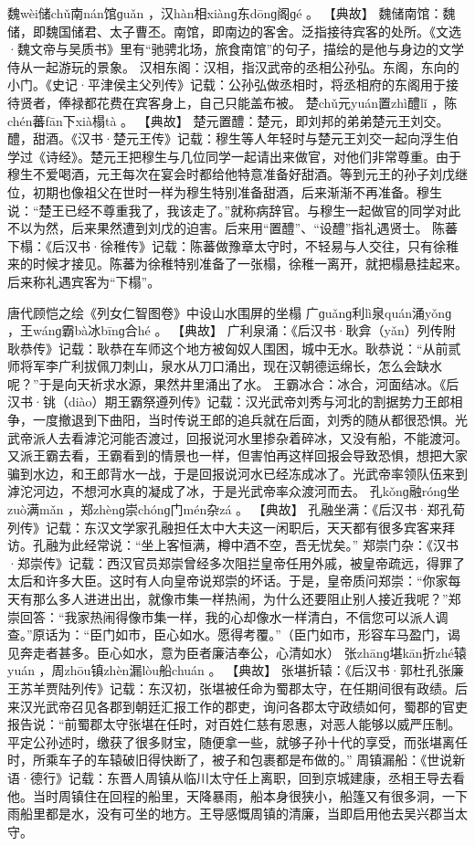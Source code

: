 \documentclass[12pt,UTF8]{ctexbook}
\begin{document}
魏wèi储chǔ南nán馆ɡuǎn
，汉hàn相xiànɡ东dōnɡ阁ɡé
。
【典故】
魏储南馆：魏储，即魏国储君、太子曹丕。南馆，即南边的客舍。泛指接待宾客的处所。《文选·魏文帝与吴质书》里有“驰骋北场，旅食南馆”的句子，描绘的是他与身边的文学侍从一起游玩的景象。
汉相东阁：汉相，指汉武帝的丞相公孙弘。东阁，东向的小门。《史记·平津侯主父列传》记载：公孙弘做丞相时，将丞相府的东阁用于接待贤者，俸禄都花费在宾客身上，自己只能盖布被。
楚chǔ元yuán置zhì醴lǐ
，陈chén蕃fān下xià榻tà
。
【典故】
楚元置醴：楚元，即刘邦的弟弟楚元王刘交。醴，甜酒。《汉书·楚元王传》记载：穆生等人年轻时与楚元王刘交一起向浮生伯学过《诗经》。楚元王把穆生与几位同学一起请出来做官，对他们非常尊重。由于穆生不爱喝酒，元王每次在宴会时都给他特意准备好甜酒。等到元王的孙子刘戊继位，初期也像祖父在世时一样为穆生特别准备甜酒，后来渐渐不再准备。穆生说：“楚王已经不尊重我了，我该走了。”就称病辞官。与穆生一起做官的同学对此不以为然，后来果然遭到刘戊的迫害。后来用“置醴”、“设醴”指礼遇贤士。
陈蕃下榻：《后汉书·徐稚传》记载：陈蕃做豫章太守时，不轻易与人交往，只有徐稚来的时候才接见。陈蕃为徐稚特别准备了一张榻，徐稚一离开，就把榻悬挂起来。后来称礼遇宾客为“下榻”。

唐代顾恺之绘《列女仁智图卷》中设山水围屏的坐榻
广ɡuǎnɡ利lì泉quán涌yǒnɡ
，王wánɡ霸bà冰bīnɡ合hé
。
【典故】
广利泉涌：《后汉书·耿弇（yǎn）列传附耿恭传》记载：耿恭在车师这个地方被匈奴人围困，城中无水。耿恭说：“从前贰师将军李广利拔佩刀刺山，泉水从刀口涌出，现在汉朝德运绵长，怎么会缺水呢？”于是向天祈求水源，果然井里涌出了水。
王霸冰合：冰合，河面结冰。《后汉书·铫（diào）期王霸祭遵列传》记载：汉光武帝刘秀与河北的割据势力王郎相争，一度撤退到下曲阳，当时传说王郎的追兵就在后面，刘秀的随从都很恐惧。光武帝派人去看滹沱河能否渡过，回报说河水里掺杂着碎冰，又没有船，不能渡河。又派王霸去看，王霸看到的情景也一样，但害怕再这样回报会导致恐惧，想把大家骗到水边，和王郎背水一战，于是回报说河水已经冻成冰了。光武帝率领队伍来到滹沱河边，不想河水真的凝成了冰，于是光武帝率众渡河而去。
孔kǒnɡ融rónɡ坐zuò满mǎn
，郑zhènɡ崇chónɡ门mén杂zá
。
【典故】
孔融坐满：《后汉书·郑孔荀列传》记载：东汉文学家孔融担任太中大夫这一闲职后，天天都有很多宾客来拜访。孔融为此经常说：“坐上客恒满，樽中酒不空，吾无忧矣。”
郑崇门杂：《汉书·郑崇传》记载：西汉官员郑崇曾经多次阻拦皇帝任用外戚，被皇帝疏远，得罪了太后和许多大臣。这时有人向皇帝说郑崇的坏话。于是，皇帝质问郑崇：“你家每天有那么多人进进出出，就像市集一样热闹，为什么还要阻止别人接近我呢？”郑崇回答：“我家热闹得像市集一样，我的心却像水一样清白，不信您可以派人调查。”原话为：“臣门如市，臣心如水。愿得考覆。”（臣门如市，形容车马盈门，谒见奔走者甚多。臣心如水，意为臣者廉洁奉公，心清如水）
张zhānɡ堪kān折zhé辕yuán
，周zhōu镇zhèn漏lòu船chuán
。
【典故】
张堪折辕：《后汉书·郭杜孔张廉王苏羊贾陆列传》记载：东汉初，张堪被任命为蜀郡太守，在任期间很有政绩。后来汉光武帝召见各郡到朝廷汇报工作的郡吏，询问各郡太守政绩如何，蜀郡的官吏报告说：“前蜀郡太守张堪在任时，对百姓仁慈有恩惠，对恶人能够以威严压制。平定公孙述时，缴获了很多财宝，随便拿一些，就够子孙十代的享受，而张堪离任时，所乘车子的车辕破旧得快断了，被子和包裹都是布做的。”
周镇漏船：《世说新语·德行》记载：东晋人周镇从临川太守任上离职，回到京城建康，丞相王导去看他。当时周镇住在回程的船里，天降暴雨，船本身很狭小，船篷又有很多洞，一下雨船里都是水，没有可坐的地方。王导感慨周镇的清廉，当即启用他去吴兴郡当太守。
\end{document}
